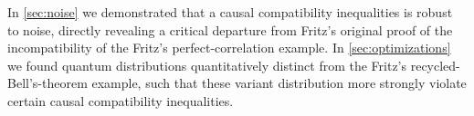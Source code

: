 \documentclass[aps, 10pt, english, twoside, pra, nofootinbib, tightenlines, longbibliography, superscriptaddress]{revtex4-1}
\begin{document}
    In \cref{sec:noise} we demonstrated that a causal compatibility inequalities is robust to noise, directly revealing a critical departure from Fritz's original proof of the incompatibility of the Fritz's perfect-correlation example. In \cref{sec:optimizations} we found quantum distributions quantitatively distinct from the Fritz's recycled-Bell's-theorem example, such that these variant distribution more strongly violate certain causal compatibility inequalities.


\end{document}
